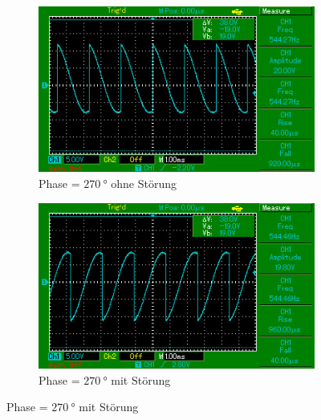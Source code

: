 \begin{figure}[H]
\begin{subfigure}{0.495\linewidth}
        \includegraphics[width=\textwidth]{images/aufg2_phi270.jpg}
        \caption{Phase = $\SI{270}{\degree}$ ohne Störung}
        \label{fig:3i}
    \end{subfigure}
    \begin{subfigure}{0.495\linewidth}
        \centering
        \includegraphics[width=\textwidth]{images/aufg3_phi270.jpg}
        \caption{Phase = $\SI{270}{\degree}$ mit Störung}
        \label{fig:3j}
    \end{subfigure}
\end{figure}

\begin{table}[H]
    \centering
    
    \caption{Messwerte ohne Störung}
    \label{tab:1}
\end{table}

\begin{table}
    \centering
    
    \caption{Messwerte mit Störung}
    \label{tab:2}
\end{table}

